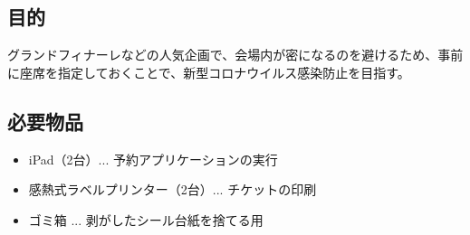 \documentclass[dvipdfmx,jb5]{jarticle}
\begin{document}
 \subsection{目的}
 グランドフィナーレなどの人気企画で、会場内が密になるのを避けるため、事前に座席を指定しておくことで、新型コロナウイルス感染防止を目指す。
 \subsection{必要物品}
 \begin{itemize}
 \item iPad（2台）... 予約アプリケーションの実行
 \item 感熱式ラベルプリンター（2台）... チケットの印刷
 \item ゴミ箱 ... 剥がしたシール台紙を捨てる用
 \end{itemize}
\end{document}
